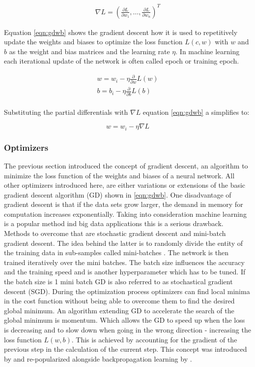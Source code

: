 \begin{eqnarray}
 \nabla L = \left(\frac{\partial L}{\partial w_1}, \ldots ,
 \frac{\partial L}{\partial w_n}\right)^T
 \label{eqn:gd}
\end{eqnarray}

Equation \ref{eqn:gdwb} shows the gradient descent how it is used to repetitively update the weights and biases to
optimize the loss function $L(c,w)$ with $w$ and $b$ as the weight and bias matrices and the learning rate $\eta$. In
machine learning each iterational update of the network is often called epoch or training epoch.

\begin{subequations}
 \begin{align}
   w = w_i - \eta \frac{\partial}{\partial w}L(w) \\
   b = b_i - \eta \frac{\partial}{\partial b}L(b) \\
 \end{align}
 \label{eqn:gdwb}
\end{subequations}

Substituting the partial differentials with $\nabla L$ equation \ref{eqn:gdwb} a simplifies to:

\begin{equation}
  w = w_i - \eta  \nabla L
  \label{eqn:simplegd}  
\end{equation}

\subsubsection{Optimizers}
The previous section introduced the concept of gradient descent, an algorithm to minimize the loss function of the
weights and biases of a neural network. All other optimizers introduced here, are either variations or extensions of the
basic gradient descent algorithm (GD) shown in \ref{eqn:gdwb}. One disadvantage of gradient descent is that if the data
sets grow larger, the demand in memory for computation increases exponentially. Taking into consideration machine
learning is a popular method ind big data applications this is a serious drawback. Methods to overcome that are
stochastic gradient descent and mini-batch gradient descent.  The idea behind the latter is to randomly divide the
entity of the training data in sub-samples called mini-batches \cite{bottou-bousquet-2008}. The network is then trained
iteratively over the mini batches. The batch size influences the accuracy and the training speed and is another
hyperparameter which has to be tuned. If the batch size is 1 mini batch GD is also referred to as stochastical gradient
descent (SGD).  During the optimization process optimizers can find local minima in the cost function without being able
to overcome them to find the desired global minimum. An algorithm extending GD to accelerate the search of the global
minimum is momentum. Which allows the GD to speed up when the loss is decreasing and to slow down when going in the
wrong direction - increasing the loss function $L(w,b)$. This is achieved by accounting for the gradient of the previous
step in the calculation of the current step. This concept was introduced by \cite{polyak1964} and re-popularized
alongside backpropagation learning by \cite{rumelhart1988learning}.

